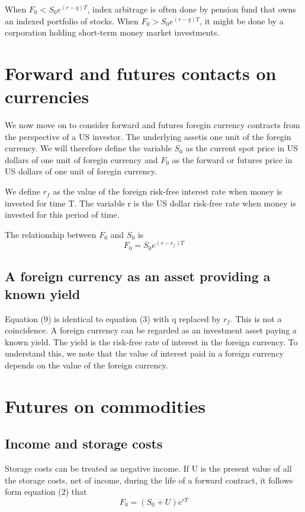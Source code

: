 \documentclass{article}
\begin{document}
When $ F_0<S_0e^{(r-q)T} $, index arbitrage is often done by pension fund that owns an indexed portfolio of stocks. When $ F_0>S_0e^{(r-q)T} $, it might be done by a corporation holding short-term money market investments.

\section{Forward and futures contacts on currencies}
We now move on to consider forward and futures foregin currency contracts from the perspective of a US investor. The underlying assetis one unit of the foregin currency. We will therefore define the variable $ S_0 $ as the current spot price in US dollars of one unit of foregin currency and $ F_0 $ as the forward or futures price in US dollars of one unit of foregin currency.

We define $ r_f $ as the value of the foreign risk-free interest rate when money is invested for time T. The variable r is the US dollar risk-free rate when money is invested for this period of time.

The relationship between $ F_0 $ and $ S_0 $ is
\begin{equation}
	F_0=S_0e^{(r-r_f)T}
\end{equation}

\subsection{A foreign currency as an asset providing a known yield}
Equation (9) is identical to equation (3) with q replaced by $ r_f $. This is not a coincidence. A foreign currency can be regarded as an investment asset paying a known yield. The yield is the risk-free rate of interest in the foreign currency. To understand this, we note that the value of interest paid in a foreign currency depends on the value of the foreign currency.

\section{Futures on commodities}
\subsection{Income and storage costs}
Storage costs can be treated as negative income. If U is the present value of all the storage costs, net of income, during the life of a forward contract, it follows form equation (2) that
\begin{equation}
	F_0=(S_0+U)e^{rT}
\end{equation}
\end{document}

